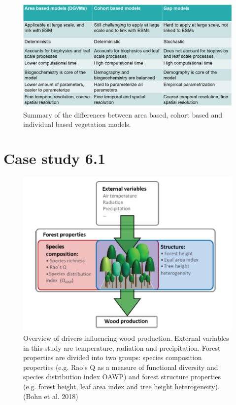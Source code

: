 \documentclass[12pt,oneside]{book}
\begin{document}
\begin{figure}

{\centering \includegraphics[width=0.8\linewidth]{figures/chap6/f634_table} 

}

\caption{Summary of the differences between area based, cohort based and individual based vegetation models.}\label{fig:f634}
\end{figure}

\section{Case study 6.1}\label{case-study-6.1}

\begin{figure}

{\centering \includegraphics[width=0.8\linewidth]{figures/chap6/f635_bohn1} 

}

\caption{Overview of drivers influencing wood production. External variables in this study are temperature, radiation and precipitation. Forest properties are divided into two groups: species composition properties (e.g. Rao’s Q as a measure of functional diversity and species distribution index OAWP) and forest structure properties (e.g. forest height, leaf area index and tree height heterogeneity). (Bohn et al. 2018)}\label{fig:f635}
\end{figure}
\end{document}
